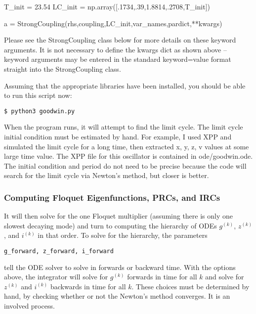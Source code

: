 \documentclass[english,a4paper,oneside]{article}
\newenvironment{Shaded}{}{}
\newcommand{\DecValTok}[1]{\textcolor[rgb]{0.25,0.63,0.44}{#1}}
\newcommand{\FloatTok}[1]{\textcolor[rgb]{0.25,0.63,0.44}{#1}}
\newcommand{\OperatorTok}[1]{\textcolor[rgb]{0.40,0.40,0.40}{#1}}
\newcommand{\NormalTok}[1]{#1}
\begin{document}
\begin{Shaded}
\begin{Highlighting}[]
\NormalTok{    T_init }\OperatorTok{=} \FloatTok{23.54}
\NormalTok{    LC_init }\OperatorTok{=}\NormalTok{ np.array([.}\DecValTok{1734}\NormalTok{,.}\DecValTok{39}\NormalTok{,}\FloatTok{1.8814}\NormalTok{,.}\DecValTok{2708}\NormalTok{,T_init])}
    
\NormalTok{    a }\OperatorTok{=}\NormalTok{ StrongCoupling(rhs,coupling,LC_init,var_names,pardict,}\OperatorTok{**}\NormalTok{kwargs)}
\end{Highlighting}
\end{Shaded}

Please see the StrongCoupling class below for more details on these
keyword arguments. It is not necessary to define the kwargs dict as
shown above -- keyword arguments may be entered in the standard
keyword=value format straight into the StrongCoupling class.

Assuming that the appropriate libraries have been installed, you should
be able to run this script now:

\begin{verbatim}
$ python3 goodwin.py
\end{verbatim}

When the program runs, it will attempt to find the limit cycle. The
limit cycle initial condition must be estimated by hand. For example, I
used XPP and simulated the limit cycle for a long time, then extracted
x, y, z, v values at some large time value. The XPP file for this
oscillator is contained in ode/goodwin.ode. The initial condition and
period do not need to be precise because the code will search for the
limit cycle via Newton's method, but closer is better.

\subsubsection{Computing Floquet Eigenfunctions, PRCs, and
IRCs}\label{computing-floquet-eigenfunctions-prcs-and-ircs}

It will then solve for the one Floquet multiplier (assuming there is
only one slowest decaying mode) and turn to computing the hierarchy of
ODEs \(g^{(k)}\), \(z^{(k)}\), and \(i^{(k)}\) in that order. To solve
for the hierarchy, the parameters

\begin{verbatim}
g_forward, z_forward, i_forward
\end{verbatim}

tell the ODE solver to solve in forwards or backward time. With the
options above, the integrator will solve for \(g^{(k)}\) forwards in
time for all \(k\) and solve for \(z^{(k)}\) and \(i^{(k)}\) backwards
in time for all \(k\). These choices must be determined by hand, by
checking whether or not the Newton's method converges. It is an involved
process.
\end{document}
